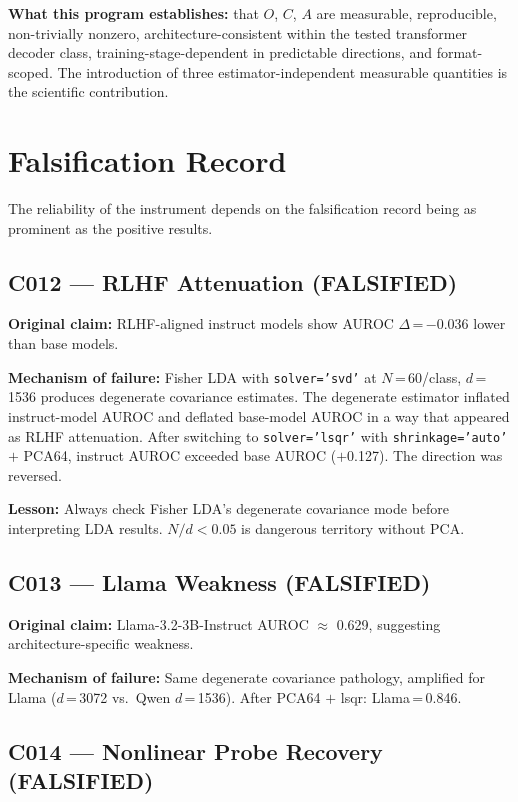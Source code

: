 \documentclass[11pt]{article}
\newcommand{\code}[1]{\texttt{\small #1}}
\begin{document}
\textbf{What this program establishes:} that $O$, $C$, $A$ are measurable, reproducible,
non-trivially nonzero, architecture-consistent within the tested transformer decoder
class, training-stage-dependent in predictable directions, and format-scoped. The
introduction of three estimator-independent measurable quantities is the scientific
contribution.

\section{Falsification Record}
\label{sec:falsification}

The reliability of the instrument depends on the falsification record being as prominent
as the positive results.

\subsection{C012 --- RLHF Attenuation (FALSIFIED)}

\textbf{Original claim:} RLHF-aligned instruct models show AUROC $\Delta$\,=\,$-$0.036
lower than base models.

\textbf{Mechanism of failure:} Fisher LDA with \code{solver='svd'} at $N$\,=\,60/class,
$d$\,=\,1536 produces degenerate covariance estimates. The degenerate estimator inflated
instruct-model AUROC and deflated base-model AUROC in a way that appeared as RLHF
attenuation. After switching to \code{solver='lsqr'} with \code{shrinkage='auto'}
$+$ PCA64, instruct AUROC exceeded base AUROC ($+$0.127). The direction was reversed.

\textbf{Lesson:} Always check Fisher LDA's degenerate covariance mode before interpreting
LDA results. $N/d < 0.05$ is dangerous territory without PCA.

\subsection{C013 --- Llama Weakness (FALSIFIED)}

\textbf{Original claim:} Llama-3.2-3B-Instruct AUROC $\approx$ 0.629, suggesting
architecture-specific weakness.

\textbf{Mechanism of failure:} Same degenerate covariance pathology, amplified for
Llama ($d$\,=\,3072 vs.\ Qwen $d$\,=\,1536). After PCA64 $+$ lsqr: Llama\,=\,0.846.

\subsection{C014 --- Nonlinear Probe Recovery (FALSIFIED)}
\end{document}
